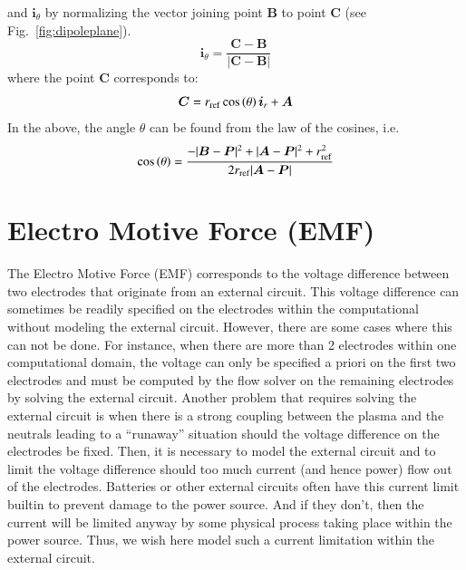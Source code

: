 \documentclass{warpdoc}
\renewcommand{\vec}[1]{\bm{#1}}
\begin{document}
%
and $\vec{i}_\theta$ by normalizing
the vector joining point {$\vec{B}$} to point {$\vec{C}$} (see Fig.\ \ref{fig:dipoleplane}).
%
\begin{equation}
\vec{i}_\theta=\frac{\vec{C}-\vec{B}}{|\vec{C}-\vec{B}|}
\end{equation}
%
where the point $\vec{C}$ corresponds to:
%
\begin{equation}
\vec{C}=r_{\rm ref} \cos \left( \theta \right) \vec{i}_r + \vec{A}
\end{equation}
%
In the above, the angle $\theta$ can be found from the law of the cosines, i.e.
%
\begin{equation}
     \cos \left( \theta \right)=
       \frac{-|\vec{B}-\vec{P}|^2 + |\vec{A}-\vec{P}|^2 + r_{\rm ref}^2}{2 r_{\rm ref}|\vec{A}-\vec{P}|}
\end{equation}
%


\section{Electro Motive Force (EMF)}

The Electro Motive Force (EMF) corresponds to the voltage difference between two electrodes that originate from an external circuit. This voltage difference can sometimes be readily specified on the electrodes within the computational without modeling the external circuit. However, there are some cases where this can not be done. For instance, when there are more than 2 electrodes within one computational domain, the voltage can only be specified a priori on the first two electrodes and must be computed by the flow solver on the remaining electrodes by solving the external circuit. Another problem that requires solving the external circuit is when there is a strong coupling between the plasma and the neutrals leading to a ``runaway'' situation should the voltage difference on the electrodes be fixed. Then, it is necessary to model the external circuit and to limit the voltage difference should too much current (and hence power) flow out of the electrodes. Batteries or other external circuits often have this current limit builtin to prevent damage to the power source. And if they don't, then the current will be limited anyway by some physical process taking place within the power source. Thus, we wish here model such a current limitation within the external circuit.   
\end{document}
